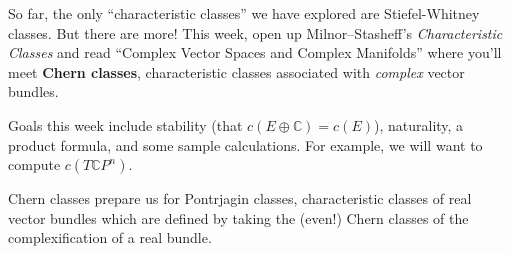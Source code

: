 \documentclass{homework}
\author{Jim Fowler}
\date{Week 10: Chern classes}
\begin{document}
\maketitle

So far, the only ``characteristic classes'' we have explored are
Stiefel-Whitney classes.  But there are more!  This week, open up
Milnor--Stasheff's \textit{Characteristic Classes} and read ``Complex
Vector Spaces and Complex Manifolds'' where you'll meet \textbf{Chern
  classes}, characteristic classes associated with \textit{complex}
vector bundles.

Goals this week include stability (that
$c(E \oplus \mathbb{C}) = c(E)$), naturality, a product formula, and
some sample calculations.  For example, we will want to compute
$c(T\mathbb{C}P^n)$.

Chern classes prepare us for Pontrjagin classes, characteristic
classes of real vector bundles which are defined by taking the (even!)
Chern classes of the complexification of a real bundle.
\end{document}
